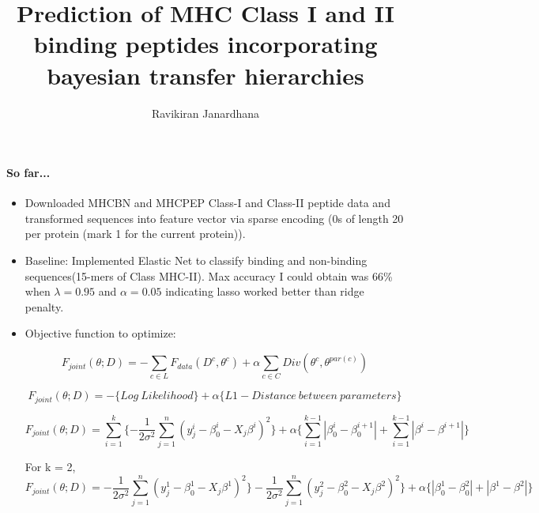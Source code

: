 \documentclass{article}
\title{Prediction of MHC Class I and II binding peptides incorporating bayesian transfer hierarchies}
\author{Ravikiran Janardhana}
\begin{document}
\maketitle
\paragraph{So far...}
\begin{itemize}
    \item{Downloaded MHCBN and MHCPEP Class-I and Class-II peptide data and transformed sequences into feature vector via sparse encoding (0s of length 20 per protein (mark 1 for the current protein)).}

    \item{Baseline: Implemented Elastic Net to classify binding and non-binding sequences(15-mers of Class MHC-II). Max accuracy I could obtain was 66\% when $\lambda = 0.95$ and $\alpha = 0.05$ indicating lasso worked better than ridge penalty.}

    \item{Objective function to optimize:

        \begin{equation}
            F_{joint}(\theta;D) = -\sum\limits_{c \in L} F_{data}(D^{c}, \theta^{c}) + \alpha \sum\limits_{c \in C} Div(\theta^{c}, \theta^{par(c)})
        \end{equation}

        \begin{equation}
            F_{joint}(\theta;D) = - \{Log\ Likelihood\} + \alpha \{L1-Distance\ between\ parameters\}
        \end{equation}

        \begin{equation}
            F_{joint}(\theta;D) =  \sum\limits_{i=1}^{k} \{- \frac{1}{2\sigma^{2}} \sum\limits_{j=1}^{n} (y_j^i - \beta_0^i - X_j \beta^i)^{2} \} + \alpha \{ \sum\limits_{i=1}^{k-1} |\beta_0^i-\beta_0^{i+1}| + \sum\limits_{i=1}^{k-1} |\beta^i-\beta^{i+1}| \}
        \end{equation}

	For k = 2, \\
        \begin{equation}
            F_{joint}(\theta;D) =  - \frac{1}{2\sigma^{2}} \sum\limits_{j=1}^{n} (y_j^1 - \beta_0^1 - X_j \beta^1)^{2} \}  
                                   - \frac{1}{2\sigma^{2}} \sum\limits_{j=1}^{n} (y_j^2 - \beta_0^2 - X_j \beta^2)^{2} \} + 
                                   \alpha \{ |\beta_0^1-\beta_0^{2}| + |\beta^1-\beta^{2}| \}
        \end{equation}

}
\end{itemize}
\end{document}
